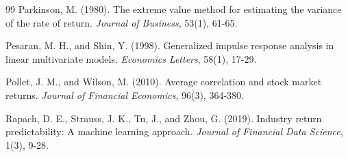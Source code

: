 \documentclass[11pt]{article}
\begin{document}
\begin{thebibliography}{99}
Parkinson, M. (1980). The extreme value method for estimating the variance of the rate of return. \textit{Journal of Business}, 53(1), 61-65.

Pesaran, M. H., and Shin, Y. (1998). Generalized impulse response analysis in linear multivariate models. \textit{Economics Letters}, 58(1), 17-29.

Pollet, J. M., and Wilson, M. (2010). Average correlation and stock market returns. \textit{Journal of Financial Economics}, 96(3), 364-380.

Rapach, D. E., Strauss, J. K., Tu, J., and Zhou, G. (2019). Industry return predictability: A machine learning approach. \textit{Journal of Financial Data Science}, 1(3), 9-28.

\end{thebibliography}
\end{document}
